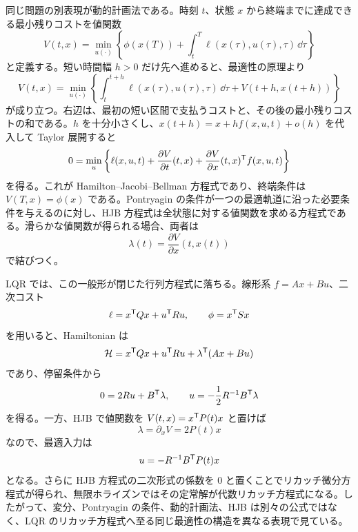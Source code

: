 同じ問題の別表現が動的計画法である。時刻 $t$、状態 $x$ から終端までに達成できる最小残りコストを値関数
\begin{equation}
  V(t,x)=
  \min_{u(\cdot)}
  \left\{
    \phi(x(T))
    +\int_t^T \ell(x(\tau),u(\tau),\tau)\,\dd \tau
  \right\}
  \label{eq:value-function-entry}
\end{equation}
と定義する。短い時間幅 $h>0$ だけ先へ進めると、最適性の原理より
\begin{equation}
  V(t,x)=
  \min_{u(\cdot)}
  \left\{
    \int_t^{t+h}\ell(x(\tau),u(\tau),\tau)\,\dd \tau
    +V(t+h,x(t+h))
  \right\}
  \label{eq:dynamic-programming-principle}
\end{equation}
が成り立つ。右辺は、最初の短い区間で支払うコストと、その後の最小残りコストの和である。$h$ を十分小さくし、$x(t+h)=x+h f(x,u,t)+o(h)$ を代入して Taylor 展開すると
\begin{align}
  0=
  \min_u
  \left\{
    \ell(x,u,t)
    +\frac{\partial V}{\partial t}(t,x)
    +\frac{\partial V}{\partial x}(t,x)^{\mathsf{T}} f(x,u,t)
  \right\}
  \label{eq:hjb-entry}
\end{align}
を得る。これが Hamilton--Jacobi--Bellman 方程式であり、終端条件は $V(T,x)=\phi(x)$ である。Pontryagin の条件が一つの最適軌道に沿った必要条件を与えるのに対し、HJB 方程式は全状態に対する値関数を求める方程式である。滑らかな値関数が得られる場合、両者は
\begin{equation}
  \lambda(t)=
  \frac{\partial V}{\partial x}(t,x(t))
  \label{eq:costate-value-gradient}
\end{equation}
で結びつく。

LQR では、この一般形が閉じた行列方程式に落ちる。線形系 $f=Ax+Bu$、二次コスト
\begin{equation}
  \ell=x^{\mathsf{T}} Qx+u^{\mathsf{T}} Ru,
  \qquad
  \phi=x^{\mathsf{T}} Sx
\end{equation}
を用いると、Hamiltonian は
\begin{equation}
  \mathcal{H}
  =
  x^{\mathsf{T}} Qx+u^{\mathsf{T}} Ru+\lambda^{\mathsf{T}}(Ax+Bu)
\end{equation}
であり、停留条件から
\begin{equation}
  0=2Ru+B^{\mathsf{T}}\lambda,
  \qquad
  u=-\frac{1}{2}R^{-1}B^{\mathsf{T}}\lambda
\end{equation}
を得る。一方、HJB で値関数を $V(t,x)=x^{\mathsf{T}} P(t)x$ と置けば
\begin{equation}
  \lambda=\partial_x V=2P(t)x
\end{equation}
なので、最適入力は
\begin{equation}
  u=-R^{-1}B^{\mathsf{T}} P(t)x
\end{equation}
となる。さらに HJB 方程式の二次形式の係数を 0 と置くことでリカッチ微分方程式が得られ、無限ホライズンではその定常解が代数リカッチ方程式になる。したがって、変分、Pontryagin の条件、動的計画法、HJB は別々の公式ではなく、LQR のリカッチ方程式へ至る同じ最適性の構造を異なる表現で見ている。


